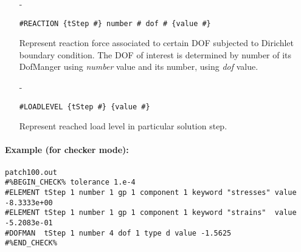 \documentclass[a4paper]{article}
\begin{document}
\begin{itemize}
\item[-]
\begin{verbatim}
#REACTION {tStep #} number # dof # {value #}
\end{verbatim}
Represent reaction force associated to certain DOF subjected to Dirichlet boundary condition.
The DOF of interest is determined by number of its DofManger 
using {\em number} value and its number, using {\em dof} value.

\item[-]
\begin{verbatim}
#LOADLEVEL {tStep #} {value #}
\end{verbatim}
Represent reached load level in particular solution step.
\end{itemize}

\paragraph{Example (for checker mode):}
\begin{verbatim}
patch100.out
#%BEGIN_CHECK% tolerance 1.e-4
#ELEMENT tStep 1 number 1 gp 1 component 1 keyword "stresses" value -8.3333e+00
#ELEMENT tStep 1 number 1 gp 1 component 1 keyword "strains"  value -5.2083e-01
#DOFMAN  tStep 1 number 4 dof 1 type d value -1.5625
#%END_CHECK%
\end{verbatim}
\end{document}
